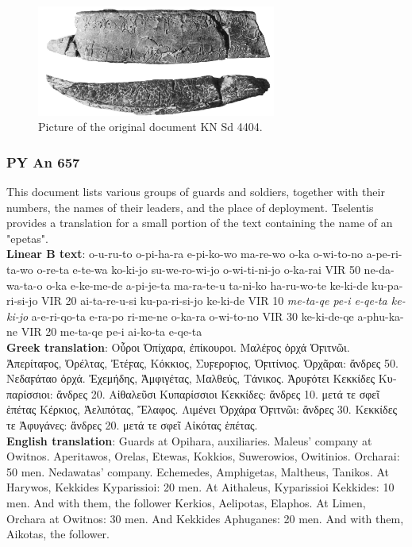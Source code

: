 \begin{figure}[H]
  \centering
  \includegraphics[width=0.7\textwidth]{Images/454.png} %
  \caption{Picture of the original document KN Sd 4404.}
  \label{fig:doc6}
\end{figure}

\subsubsection{PY An 657} \label{doc:pyan657}
This document lists various groups of guards and soldiers, together with their numbers, the names of their leaders, and the place of deployment.
Tselentis provides a translation for a small portion of the text containing the name of an "epetas". \\

\textbf{Linear B text}: o-u-ru-to o-pi-ha-ra e-pi-ko-wo ma-re-wo o-ka o-wi-to-no a-pe-ri-ta-wo o-re-ta e-te-wa ko-ki-jo su-we-ro-wi-jo o-wi-ti-ni-jo o-ka-rai VIR 50 ne-da-wa-ta-o o-ka e-ke-me-de a-pi-je-ta ma-ra-te-u ta-ni-ko ha-ru-wo-te ke-ki-de ku-pa-ri-si-jo VIR 20 ai-ta-re-u-si ku-pa-ri-si-jo ke-ki-de VIR 10 \textit{me-ta-qe pe-i e-qe-ta ke-ki-jo} a-e-ri-qo-ta e-ra-po ri-me-ne o-ka-ra o-wi-to-no VIR 30 ke-ki-de-qe a-phu-ka-ne VIR 20 me-ta-qe pe-i ai-ko-ta e-qe-ta \\
\textbf{Greek translation}: \textgreek{Οὖροι Ὀπίχαρα, ἐπίκουροι. Μαλέϝος ὀρχά Ὀϝιτνῶι. Ἀπερίταϝος, Ὀρέλτας, Ἐτέϝας, Κόκκιος, Συϝεροϝιος, Ὀϝιτίνιος. Ὀρχᾶραι: ἄνδρες 50. Νεδαϝάταο ὀρχά. Ἐχεμήδης, Ἀμφιγέτας, Μαλθεύς, Τάνικος. Ἁρυϝότει Κεκκίδες Κυπαρίσσιοι: ἄνδρες 20. Αἰθαλεῦσι Κυπαρίσσιοι Κεκκίδες: ἄνδρες 10. μετά τε σφεῖ ἑπέτας Κέρκιος, Ἀελιπότας, Ἔλαφος. Λιμένει Ὀρχάρα Ὀϝιτνῶι: ἄνδρες 30. Κεκκίδες τε Ἀφυγάνες: ἄνδρες 20. μετά τε σφεῖ Αἰκότας ἑπέτας.} \\
\textbf{English translation}: Guards at Opihara, auxiliaries. Maleus' company at Owitnos. Aperitawos, Orelas, Etewas, Kokkios, Suwerowios, Owitinios. Orcharai: 50 men. Nedawatas' company. Echemedes, Amphigetas, Maltheus, Tanikos. At Harywos, Kekkides Kyparissioi: 20 men. At Aithaleus, Kyparissioi Kekkides: 10 men. And with them, the follower Kerkios, Aelipotas, Elaphos. At Limen, Orchara at Owitnos: 30 men. And Kekkides Aphuganes: 20 men. And with them, Aikotas, the follower.


